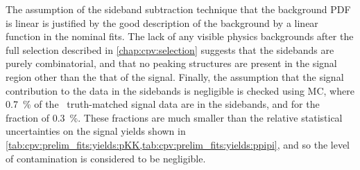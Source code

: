 The assumption of the sideband subtraction technique that the background 
\ac{PDF} is linear is justified by the good description of the background by a 
linear function in the nominal fits.
The lack of any visible physics backgrounds after the full selection described 
in \cref{chap:cpv:selection} suggests that the sidebands are purely 
combinatorial, and that no peaking structures are present in the signal region 
other than the that of the signal.
Finally, the assumption that the signal contribution to the data in the 
sidebands is negligible is checked using \ac{MC}, where \SI{0.7}{\percent} of 
the \ppipi\ truth-matched signal data are in the sidebands, and for \pKK the 
fraction of \SI{0.3}{\percent}.
These fractions are much smaller than the relative statistical uncertainties on 
the signal yields shown in 
\cref{tab:cpv:prelim_fits:yields:pKK,tab:cpv:prelim_fits:yields:ppipi}, and so 
the level of contamination is considered to be negligible.

